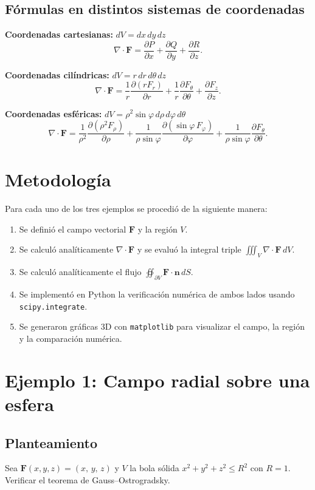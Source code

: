 \documentclass[12pt,a4paper]{article}
\begin{document}
\subsection{Fórmulas en distintos sistemas de coordenadas}

\textbf{Coordenadas cartesianas:} $dV = dx\, dy\, dz$
\[
\nabla\cdot\mathbf{F} = \frac{\partial P}{\partial x} + \frac{\partial Q}{\partial y} + \frac{\partial R}{\partial z}.
\]

\textbf{Coordenadas cilíndricas:} $dV = r\, dr\, d\theta\, dz$
\[
\nabla\cdot\mathbf{F} = \frac{1}{r}\frac{\partial(r F_r)}{\partial r} + \frac{1}{r}\frac{\partial F_\theta}{\partial \theta} + \frac{\partial F_z}{\partial z}.
\]

\textbf{Coordenadas esféricas:} $dV = \rho^2 \sin\varphi\, d\rho\, d\varphi\, d\theta$
\[
\nabla\cdot\mathbf{F} = \frac{1}{\rho^2}\frac{\partial(\rho^2 F_\rho)}{\partial \rho} + \frac{1}{\rho\sin\varphi}\frac{\partial(\sin\varphi\, F_\varphi)}{\partial \varphi} + \frac{1}{\rho\sin\varphi}\frac{\partial F_\theta}{\partial \theta}.
\]

\section{Metodología}

Para cada uno de los tres ejemplos se procedió de la siguiente manera:
\begin{enumerate}[leftmargin=1.5cm]
    \item Se definió el campo vectorial $\mathbf{F}$ y la región $V$.
    \item Se calculó analíticamente $\nabla\cdot\mathbf{F}$ y se evaluó la integral triple $\iiint_V \nabla\cdot\mathbf{F}\, dV$.
    \item Se calculó analíticamente el flujo $\oiint_{\partial V} \mathbf{F}\cdot\mathbf{n}\, dS$.
    \item Se implementó en Python la verificación numérica de ambos lados usando \texttt{scipy.integrate}.
    \item Se generaron gráficas 3D con \texttt{matplotlib} para visualizar el campo, la región y la comparación numérica.
\end{enumerate}

\section{Ejemplo 1: Campo radial sobre una esfera}

\subsection{Planteamiento}
Sea $\mathbf{F}(x,y,z)=(x,\,y,\,z)$ y $V$ la bola sólida $x^2+y^2+z^2\le R^2$ con $R=1$. Verificar el teorema de Gauss--Ostrogradsky.
\end{document}
